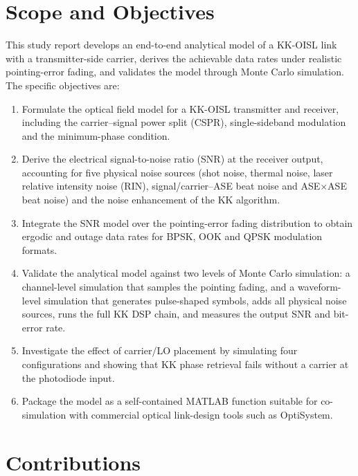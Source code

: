 \section{Scope and Objectives}

This study report develops an end-to-end analytical model of a KK-OISL link with a transmitter-side carrier, derives the achievable data rates under realistic pointing-error fading, and validates the model through Monte Carlo simulation. The specific objectives are:

\begin{enumerate}
\item Formulate the optical field model for a KK-OISL transmitter and receiver, including the carrier--signal power split (CSPR), single-sideband modulation and the minimum-phase condition.

\item Derive the electrical signal-to-noise ratio (SNR) at the receiver output, accounting for five physical noise sources (shot noise, thermal noise, laser relative intensity noise (RIN), signal/carrier--ASE beat noise and ASE$\times$ASE beat noise) and the noise enhancement of the KK algorithm.

\item Integrate the SNR model over the pointing-error fading distribution to obtain ergodic and outage data rates for BPSK, OOK and QPSK modulation formats.

\item Validate the analytical model against two levels of Monte Carlo simulation: a channel-level simulation that samples the pointing fading, and a waveform-level simulation that generates pulse-shaped symbols, adds all physical noise sources, runs the full KK DSP chain, and measures the output SNR and bit-error rate.

\item Investigate the effect of carrier/LO placement by simulating four configurations and showing that KK phase retrieval fails without a carrier at the photodiode input.

\item Package the model as a self-contained MATLAB function suitable for co-simulation with commercial optical link-design tools such as OptiSystem.
\end{enumerate}

\section{Contributions}

